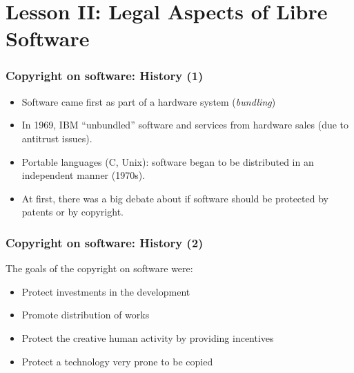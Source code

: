 

\section{Lesson II: Legal Aspects of Libre Software}




\begin{frame}
\frametitle{Copyright on software: History (1)}

\begin{itemize}
\item Software came first as part of a hardware system (\emph{bundling})
\item In 1969, IBM ``unbundled'' software and services from hardware sales (due to antitrust issues).
\item Portable languages (C, Unix): software began to be distributed in an independent manner (1970s).
\item At first, there was a big debate about if software should be protected
by patents or by copyright.
\end{itemize}

\end{frame}



\begin{frame}
\frametitle{Copyright on software: History (2)}

The goals of the copyright on software were:

\begin{itemize}
\item Protect investments in the development
\item Promote distribution of works
\item Protect the creative human activity by providing incentives
\item Protect a technology very prone to be copied
\end{itemize}

\end{frame}


